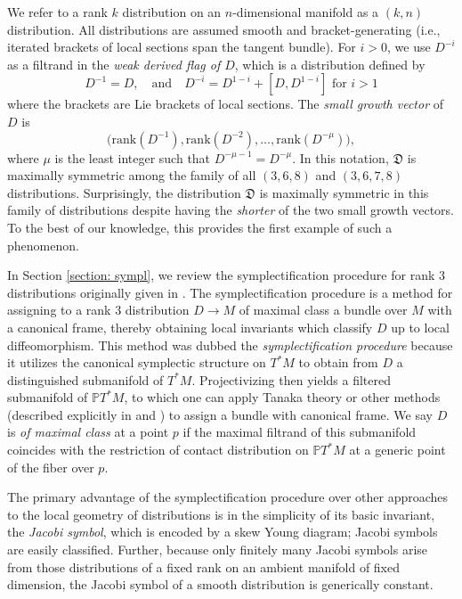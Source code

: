 \documentclass[11pt,letterpaper]{amsart}
\numberwithin{equation}{section}
\begin{document}
We refer to a rank $k$ distribution on an $n$-dimensional manifold as a $(k,n)$ distribution. All distributions are assumed smooth and bracket-generating (i.e., iterated brackets of local sections span the tangent bundle). For $i>0$, we use $D^{-i}$ as a filtrand in the \textit{weak derived flag of $D$}, which is a distribution defined by 
\begin{equation}
    D^{-1} = D,\quad\text{and}\quad  D^{-i} = D^{1-i} + [D, D^{1-i}]\text{ for }i>1
\end{equation}
where the brackets are Lie brackets of local sections. The \textit{small growth vector} of $D$ is $$\big(\mathrm{rank}(D^{-1}),\mathrm{rank}(D^{-2}),\ldots, \mathrm{rank}(D^{-\mu})\big),$$ where $\mu$ is the least integer such that $D^{-\mu-1}=D^{-\mu}$. In this notation, $\mathfrak D$ is maximally symmetric among the family of all $(3,6,8)$ and $(3,6,7,8)$ distributions. Surprisingly, the distribution $\mathfrak D$ is maximally symmetric in this family of distributions despite having the \textit{shorter} of the two small growth vectors. To the best of our knowledge, this provides the first example of such a phenomenon.

In Section \ref{section: sympl}, we review the symplectification procedure for rank $3$ distributions originally given in \cite{doubrov2008rank3}. The symplectification procedure is a method for assigning to a rank $3$ distribution $D\to M$ of maximal class a bundle over $M$ with a canonical frame, thereby obtaining local invariants which classify $D$ up to local diffeomorphism. This method was dubbed the \textit{symplectification procedure} because it utilizes the canonical symplectic structure on $T^*M$ to obtain from $D$ a distinguished submanifold of $T^*M$. Projectivizing then yields a filtered submanifold of $\mathbb{P}T^*M$, to which one can apply Tanaka theory \cite{DayDoubrovZelenko2026} or other methods (described explicitly in \cite{doubrov2008rank3} and \cite{doubrov2009london}) to assign a bundle with canonical frame. We say $D$ is \textit{of maximal class} at a point $p$ if the maximal filtrand of this submanifold coincides with the restriction of contact distribution on $\mathbb{P}T^*M$ at a generic point of the fiber over $p$.

The primary advantage of the symplectification procedure over other approaches to the local geometry of distributions is in the simplicity of its basic invariant, the \textit{Jacobi symbol}, which is encoded by a skew Young diagram; Jacobi symbols are easily classified. Further, because only finitely many Jacobi symbols arise from those distributions of a fixed rank on an ambient manifold of fixed dimension, the Jacobi symbol of a smooth distribution is generically constant. 
\end{document}
